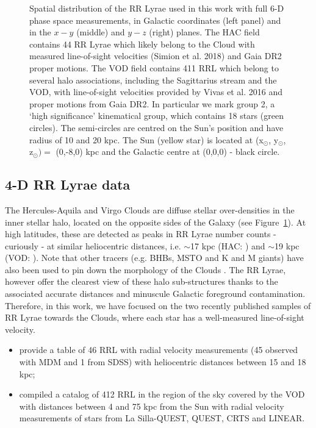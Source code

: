 \documentclass[fleqn,usenatbib]{mnras}
\begin{document}
\begin{figure}
	\vspace{-0.4cm}
    \caption{Spatial distribution of the RR Lyrae used in this work with full 6-D phase space measurements, in Galactic coordinates (left panel) and in the $x-y$ (middle) and $y-z$ (right) planes.  The HAC field contains 44 RR Lyrae which likely belong to the Cloud with measured line-of-sight  velocities (Simion et al. 2018) and  Gaia DR2 proper motions. The VOD field contains 411 RRL which belong to several halo associations, including the Sagittarius stream and the VOD, with line-of-sight velocities provided by Vivas et al. 2016 and proper motions from Gaia DR2. In particular we mark group 2, a `high significance' kinematical group, which contains 18 stars (green circles). The semi-circles are centred on the Sun's position and have radius of 10 and 20 kpc. The Sun (yellow star) is located at (x$_{\odot}$, y$_{\odot}$, z$_{\odot})= $ (0,-8,0) kpc and the Galactic centre at (0,0,0) - black circle.  }
    \label{fig:lb}
\end{figure}
%

\subsection{4-D RR Lyrae data}

The Hercules-Aquila and Virgo Clouds are diffuse stellar
over-densities in the inner stellar halo, located on the opposite
sides of the Galaxy (see Figure~\ref{fig:lb}). At high latitudes,
these are detected as peaks in RR Lyrae number counts - curiously - at
similar heliocentric distances, i.e. $\sim$17 kpc (HAC:
\citealt{Wa09,Simion2014}) and $\sim$19 kpc (VOD: \citealt{Vivas2006,
  Duffau2014, Vivas2016}). Note that other tracers (e.g. BHBs, MSTO
and K and M giants) have also been used to pin down the morphology of
the Clouds \citep[see
  e.g.][]{Be07,Juric2008,Sharma2010,Bonaca2012,Conroy2018}. The RR
Lyrae, however offer the clearest view of these halo sub-structures
thanks to the associated accurate distances and minuscule Galactic
foreground contamination. Therefore, in this work, we have focused on
the two recently published samples of RR Lyrae towards the Clouds,
where each star has a well-measured line-of-sight velocity.

\begin{itemize}
\item \citet{Simion2018} provide a table of 46 RRL with radial
  velocity measurements (45 observed with MDM and 1 from SDSS) with
  heliocentric distances between 15 and 18 kpc;
\item \cite{Vivas2016} compiled a catalog of 412 RRL in the region of
  the sky covered by the VOD with distances between 4 and 75 kpc from
  the Sun with radial velocity measurements of stars from La
  Silla-QUEST, QUEST, CRTS and LINEAR.
\end{itemize}
\end{document}

